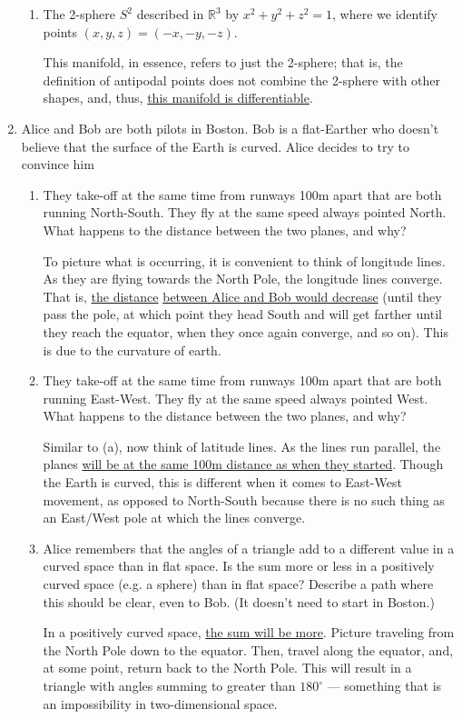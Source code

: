 \begin{enumerate}
\begin{enumerate}
      \item The 2-sphere $S^2$ described in $\mathbb{R}^3$ by $x^2 + y^2 + z^2 = 1$, where we identify points $(x, y, z) = (-x, -y, -z)$.

        This manifold, in essence, refers to just the 2-sphere; that is, the definition of antipodal points does not combine the 2-sphere with other shapes, and, thus, \underline{this manifold is differentiable}.

    \end{enumerate}

  \item Alice and Bob are both pilots in Boston. Bob is a flat-Earther who doesn't believe that the surface of the Earth is curved. Alice decides to try to convince him

    \begin{enumerate}

      \item They take-off at the same time from runways 100m apart that are both running North-South. They fly at the same speed always pointed North. What happens to the distance between the two planes, and why?

        To picture what is occurring, it is convenient to think of longitude lines. As they are flying towards the North Pole, the longitude lines converge. That is, \underline{the distance} \underline{between Alice and Bob would decrease} (until they pass the pole, at which point they head South and will get farther until they reach the equator, when they once again converge, and so on). This is due to the curvature of earth.

      \item They take-off at the same time from runways 100m apart that are both running East-West.  They fly at the same speed always pointed West. What happens to the distance between the two planes, and why?

        Similar to (a), now think of latitude lines. As the lines run parallel, the planes \underline{will be at the same 100m distance as when they started}. Though the Earth is curved, this is different when it comes to East-West movement, as opposed to North-South because there is no such thing as an East/West pole at which the lines converge.

      \item Alice remembers that the angles of a triangle add to a different value in a curved space than in flat space. Is the sum more or less in a positively curved space (e.g. a sphere) than in flat space? Describe a path where this should be clear, even to Bob. (It doesn't need to start in Boston.)

        In a positively curved space, \underline{the sum will be more}. Picture traveling from the North Pole down to the equator. Then, travel along the equator, and, at some point, return back to the North Pole. This will result in a triangle with angles summing to greater than $180^{\circ}$ — something that is an impossibility in two-dimensional space.

    \end{enumerate}

\end{enumerate}




